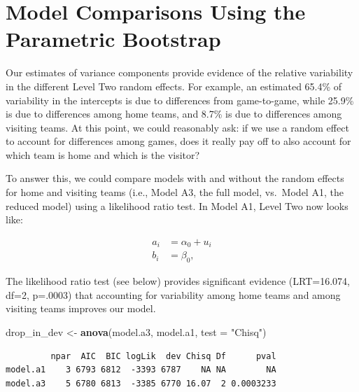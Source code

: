 \documentclass[
]{krantz}
\newenvironment{Shaded}{\begin{snugshade}}{\end{snugshade}}
\newcommand{\DataTypeTok}[1]{\textcolor[rgb]{0.27,0.27,0.27}{#1}}
\newcommand{\KeywordTok}[1]{\textcolor[rgb]{0.27,0.27,0.27}{\textbf{#1}}}
\newcommand{\NormalTok}[1]{#1}
\newcommand{\StringTok}[1]{\textcolor[rgb]{0.5,0.5,0.5}{#1}}
\begin{document}
\hypertarget{glmm-paraboot}{%
\section{Model Comparisons Using the Parametric Bootstrap}\label{glmm-paraboot}}

Our estimates of variance components provide evidence of the relative variability in the different Level Two random effects. For example, an estimated 65.4\% of variability in the intercepts is due to differences from game-to-game, while 25.9\% is due to differences among home teams, and 8.7\% is due to differences among visiting teams. At this point, we could reasonably ask: if we use a random effect to account for differences among games, does it really pay off to also account for which team is home and which is the visitor?

To answer this, we could compare models with and without the random effects for home and visiting teams (i.e., Model A3, the full model, vs.~Model A1, the reduced model) using a likelihood ratio test. In Model A1, Level Two now looks like:

\begin{align*}
a_{i} & = \alpha_{0}+u_{i} \\
b_{i} & = \beta_{0},
\end{align*}

The likelihood ratio test (see below) provides significant evidence (LRT=16.074, df=2, p=.0003) that accounting for variability among home teams and among visiting teams improves our model.

\begin{Shaded}
\begin{Highlighting}[]
\NormalTok{drop_in_dev <-}\StringTok{ }\KeywordTok{anova}\NormalTok{(model.a3, model.a1, }\DataTypeTok{test =} \StringTok{"Chisq"}\NormalTok{)}
\end{Highlighting}
\end{Shaded}

\begin{verbatim}
         npar  AIC  BIC logLik  dev Chisq Df      pval
model.a1    3 6793 6812  -3393 6787    NA NA        NA
model.a3    5 6780 6813  -3385 6770 16.07  2 0.0003233
\end{verbatim}
\end{document}
